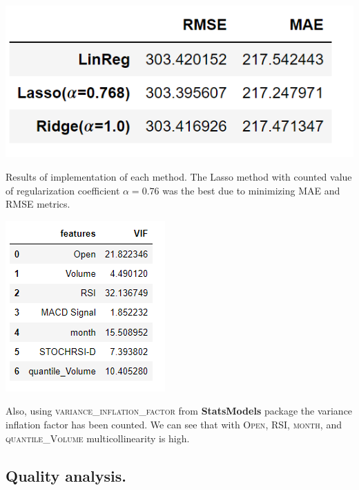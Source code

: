 \documentclass[%
12pt, %
final, %
oneside, %
onecolumn, %
centertags]{article} %
\theoremstyle{plain}
\theoremstyle{definition}
\theoremstyle{remark}
\begin{document}
\begin{center}
\includegraphics[scale=0.6]{images/results_reg.png}

Results of implementation of each method. The Lasso method with counted value of regularization coefficient $\alpha=0.76$ was the best due to minimizing \textsc{MAE} and \textsc{RMSE} metrics.
\end{center}

\begin{center}
\includegraphics[scale=0.9]{images/vif_data.png}

Also, using \textsc{variance\_inflation\_factor} from \textbf{StatsModels} package the variance inflation factor has been counted. We can see that with \textsc{Open}, \textsc{RSI}, \textsc{month}, and \textsc{quantile\_Volume} multicollinearity is high.
\end{center}

\subsection{Quality analysis.}
\end{document}
